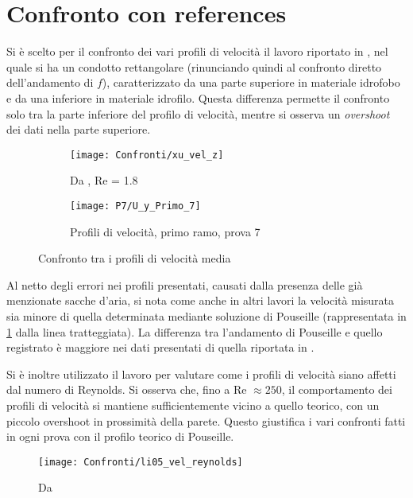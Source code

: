 \documentclass{article} %
\begin{document}
\section{Confronto con references}
Si è scelto per il confronto dei vari profili di velocità il lavoro riportato in \cite{xu08}, nel quale si ha un condotto rettangolare (rinunciando quindi al confronto diretto dell'andamento di $f$), caratterizzato da una parte superiore in materiale idrofobo e da una inferiore in materiale idrofilo. Questa differenza permette il confronto solo tra la parte inferiore del profilo di velocità, mentre si osserva un \textit{overshoot} dei dati nella parte superiore.\par
\begin{figure}[h!]
	\centering
	\begin{subfigure}{0.35\textwidth}
		\texttt{[image: Confronti/xu\_vel\_z]}
		\caption{Da \cite[fig.~8b]{xu08}, Re = 1.8}
		\label{fig:xu_mean}
	\end{subfigure}\qquad
	\begin{subfigure}{0.35\textwidth}
		\texttt{[image: P7/U\_y\_Primo\_7]}
		\caption{Profili di velocità, primo ramo, prova 7}
	\end{subfigure}
	\caption{Confronto tra i profili di velocità media}
\end{figure}
Al netto degli errori nei profili presentati, causati dalla presenza delle già menzionate sacche d'aria, si nota come anche in altri lavori la velocità misurata sia minore di quella determinata mediante soluzione di Pouseille (rappresentata in \cref{fig:xu_mean} dalla linea tratteggiata). La differenza tra l'andamento di Pouseille e quello registrato è maggiore nei dati presentati di quella riportata in \cite{xu08}.\par
Si è inoltre utilizzato il lavoro \cite{li05} per valutare come i profili di velocità siano affetti dal numero di Reynolds. Si osserva che, fino a Re $\approx 250$, il comportamento dei profili di velocità si mantiene sufficientemente vicino a quello teorico, con un piccolo overshoot in prossimità della parete. Questo giustifica i vari confronti fatti in ogni prova con il profilo teorico di Pouseille.
\begin{figure}[h!]
	\centering
	\texttt{[image: Confronti/li05\_vel\_reynolds]}
	\caption{Da \cite[fig.~5]{li05}}
\end{figure}
\end{document}

